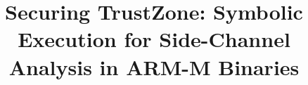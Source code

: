 \documentclass[compsoc, conference, a4paper, 10pt, times]{IEEEtran}
\begin{document}
\title{Securing TrustZone: Symbolic Execution for Side-Channel Analysis in
ARM-M Binaries}


\iffalse
\author{\IEEEauthorblockN{1\textsuperscript{st} Given Names Surname}
\IEEEauthorblockA{\textit{Affiliation} \\
City, Country \\
email address or website URL}
\and
\IEEEauthorblockN{2\textsuperscript{nd} Given Names Surname}
\IEEEauthorblockA{\textit{Affiliation} \\
City, Country \\
email address or website URL}
\and
\IEEEauthorblockN{3\textsuperscript{rd} Given Names Surname}
\IEEEauthorblockA{\textit{Affiliation} \\
City, Country \\
email address or website URL}
}
\fi

\maketitle

\begin{abstract}
\end{abstract}



%
%
%
%
%
%
%





\appendices
\end{document}

